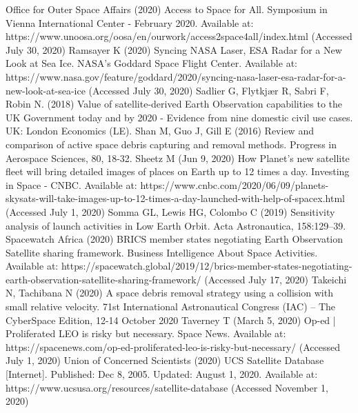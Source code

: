 \documentclass[12pt,a4paper,notitlepage,oneside,openright]{report}
\begin{document}
\begin{thebibliography}{100}
 Office for Outer Space Affairs (2020) Access to Space for All. Symposium in Vienna International Center - February 2020. Available at: https://www.unoosa.org/oosa/en/ourwork/access2space4all/index.html (Accessed July 30, 2020)
 Ramsayer K (2020) Syncing NASA Laser, ESA Radar for a New Look at Sea Ice. NASA's Goddard Space Flight Center. Available at: https://www.nasa.gov/feature/goddard/2020/syncing-nasa-laser-esa-radar-for-a-new-look-at-sea-ice (Accessed July 30, 2020)
 Sadlier G, Flytkjær R, Sabri F, Robin N. (2018) Value of satellite-derived Earth Observation capabilities to the UK Government today and by 2020 - Evidence from nine domestic civil use cases. UK: London Economics (LE).
 Shan M, Guo J, Gill E (2016) Review and comparison of active space debris capturing and removal methods. Progress in Aerospace Sciences, 80, 18-32.
 Sheetz M (Jun 9, 2020) How Planet’s new satellite fleet will bring detailed images of places on Earth up to 12 times a day. Investing in Space - CNBC. Available at: https://www.cnbc.com/2020/06/09/planets-skysats-will-take-images-up-to-12-times-a-day-launched-with-help-of-spacex.html (Accessed July 1, 2020)
 Somma GL, Lewis HG, Colombo C (2019) Sensitivity analysis of launch activities in Low Earth Orbit. Acta Astronautica, 158:129–39.
 Spacewatch Africa (2020) BRICS member states negotiating Earth Observation Satellite sharing framework. Business Intelligence About Space Activities. Available at: https://spacewatch.global/2019/12/brics-member-states-negotiating-earth-observation-satellite-sharing-framework/ (Accessed July 17, 2020)
 Takeichi N, Tachibana N (2020) A space debris removal strategy using a collision with small relative velocity. 71st International Astronautical Congress (IAC) – The CyberSpace Edition, 12-14 October 2020
 Taverney T (March 5, 2020) Op-ed | Proliferated LEO is risky but necessary. Space News. Available at: https://spacenews.com/op-ed-proliferated-leo-is-risky-but-necessary/ (Accessed July 1, 2020)
 Union of Concerned Scientists (2020) UCS Satellite Database [Internet]. Published: Dec 8, 2005. Updated: August 1, 2020. Available at: https://www.ucsusa.org/resources/satellite-database (Accessed November 1, 2020)

\end{thebibliography}
\end{document}
